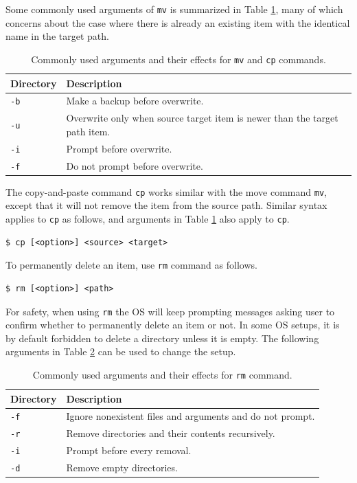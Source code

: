 Some commonly used arguments of \verb|mv| is summarized in Table \ref{ch:fm:tab:mvcpcommandargument}, many of which concerns about the case where there is already an existing item with the identical name in the target path.

\begin{table}
  \centering \caption{Commonly used arguments and their effects for \texttt{mv} and \texttt{cp} commands.}\label{ch:fm:tab:mvcpcommandargument}
  \begin{tabularx}{\textwidth}{lX}
    \hline
    Directory & Description \\ \hline
    \verb|-b| & Make a backup before overwrite. \\ 
    \verb|-u| & Overwrite only when source target item is newer than the target path item. \\ 
    \verb|-i| & Prompt before overwrite. \\ 
    \verb|-f| & Do not prompt before overwrite. \\
    \hline
  \end{tabularx}
\end{table}

The copy-and-paste command \verb|cp| works similar with the move command \verb|mv|, except that it will not remove the item from the source path. Similar syntax applies to \verb|cp| as follows, and arguments in Table \ref{ch:fm:tab:mvcpcommandargument} also apply to \verb|cp|.
\begin{lstlisting}
$ cp [<option>] <source> <target>
\end{lstlisting}

To permanently delete an item, use \verb|rm| command as follows.
\begin{lstlisting}
$ rm [<option>] <path>
\end{lstlisting}
For safety, when using \verb|rm| the OS will keep prompting messages asking user to confirm whether to permanently delete an item or not. In some OS setups, it is by default forbidden to delete a directory unless it is empty. The following arguments in Table \ref{ch:fm:tab:rmcommandargument} can be used to change the setup.

\begin{table}
  \centering \caption{Commonly used arguments and their effects for \texttt{rm} command.}\label{ch:fm:tab:rmcommandargument}
  \begin{tabularx}{\textwidth}{lX}
    \hline
    Directory & Description \\ \hline
    \verb|-f| & Ignore nonexistent files and arguments and do not prompt. \\ 
    \verb|-r| & Remove directories and their contents recursively. \\ 
    \verb|-i| & Prompt before every removal. \\ 
    \verb|-d| & Remove empty directories. \\
    \hline
  \end{tabularx}
\end{table}

